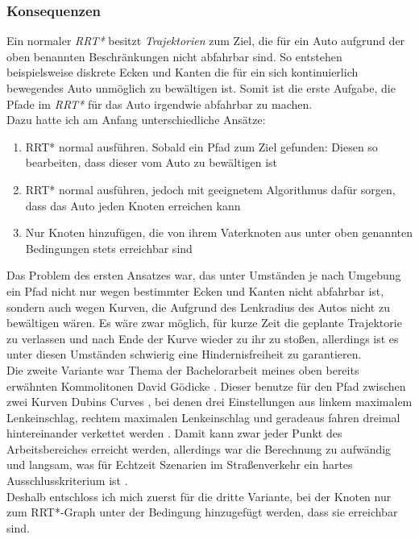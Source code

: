 \subsubsection{Konsequenzen}
Ein normaler \textit{RRT*} besitzt \textit{Trajektorien} zum Ziel, die für ein Auto aufgrund der oben benannten Beschränkungen nicht abfahrbar sind. So entstehen beispielsweise diskrete Ecken und Kanten die für ein sich kontinuierlich bewegendes Auto unmöglich zu bewältigen ist. Somit ist die erste Aufgabe, die Pfade im \textit{RRT*} für das Auto irgendwie abfahrbar zu machen.\\
Dazu hatte ich am Anfang unterschiedliche Ansätze:
\begin{enumerate}
\item RRT* normal ausführen. Sobald ein Pfad zum Ziel gefunden: Diesen so bearbeiten, dass dieser vom Auto zu bewältigen ist
\item RRT* normal ausführen, jedoch mit geeignetem Algorithmus dafür sorgen, dass das Auto jeden Knoten erreichen kann
\item Nur Knoten hinzufügen, die von ihrem Vaterknoten aus unter oben genannten Bedingungen stets erreichbar sind
\end{enumerate}
Das Problem des ersten Ansatzes war, das unter Umständen je nach Umgebung ein Pfad nicht nur wegen bestimmter Ecken und Kanten nicht abfahrbar ist, sondern auch wegen Kurven, die Aufgrund des Lenkradius des Autos nicht zu bewältigen wären. Es wäre zwar möglich, für kurze Zeit die geplante Trajektorie zu verlassen und nach Ende der Kurve wieder zu ihr zu stoßen, allerdings ist es unter diesen Umständen schwierig eine Hindernisfreiheit zu garantieren. \\
Die zweite Variante war Thema der Bachelorarbeit meines oben bereits erwähnten Kommolitonen David Gödicke \citep{Goedicke18}. Dieser benutze für den Pfad zwischen zwei Kurven Dubins Curves \citep{Dubin61}, bei denen drei Einstellungen aus linkem maximalem Lenkeinschlag, rechtem maximalen Lenkeinschlag und geradeaus fahren dreimal hintereinander verkettet werden . Damit kann zwar jeder Punkt des Arbeitsbereiches erreicht werden, allerdings war die Berechnung zu aufwändig und langsam, was für Echtzeit Szenarien im Straßenverkehr ein hartes Ausschlusskriterium ist \citep[vergleiche][Kapitel 7]{Goedicke18}. \\
Deshalb entschloss ich mich zuerst für die dritte Variante, bei der Knoten nur zum RRT*-Graph unter der Bedingung hinzugefügt werden, dass sie erreichbar sind.

